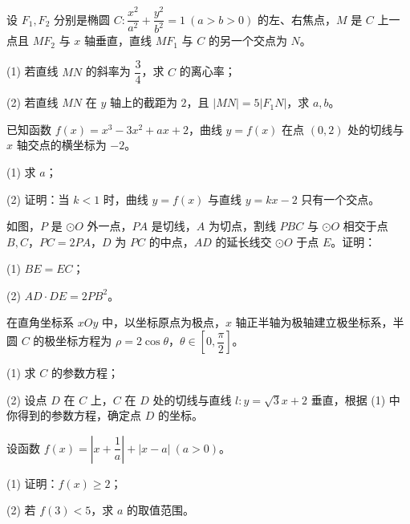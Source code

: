 \begin{question}
设 $F_1,F_2$ 分别是椭圆 $C:\dfrac{x^2}{a^2}+\dfrac{y^2}{b^2}=1\ (a>b>0)$ 的左、右焦点，$M$ 是 $C$ 上一点且 $MF_2$ 与 $x$ 轴垂直，直线 $MF_1$ 与 $C$ 的另一个交点为 $N$。

(1) 若直线 $MN$ 的斜率为 $\dfrac34$，求 $C$ 的离心率；

(2) 若直线 $MN$ 在 $y$ 轴上的截距为 $2$，且 $|MN|=5|F_1N|$，求 $a,b$。

\end{question}
\begin{question}
已知函数 $f(x)=x^3-3x^2+ax+2$，曲线 $y=f(x)$ 在点 $(0,2)$ 处的切线与 $x$ 轴交点的横坐标为 $-2$。

(1) 求 $a$；

(2) 证明：当 $k<1$ 时，曲线 $y=f(x)$ 与直线 $y=kx-2$ 只有一个交点。

\Needspace{0.4\textheight}
\end{question}
\begin{question}
如图，$P$ 是 $\odot O$ 外一点，$PA$ 是切线，$A$ 为切点，割线 $PBC$ 与 $\odot O$ 相交于点 $B,C$，$PC=2PA$，$D$ 为 $PC$ 的中点，$AD$ 的延长线交 $\odot O$ 于点 $E$。证明：
\nopagebreak[4]
\begin{center}\end{center}
\nopagebreak[4]
(1) $BE=EC$；

(2) $AD\cdot DE=2PB^2$。

\end{question}
\begin{question}
在直角坐标系 $xOy$ 中，以坐标原点为极点，$x$ 轴正半轴为极轴建立极坐标系，半圆 $C$ 的极坐标方程为 $\rho=2\cos\theta$，$\theta\in\left[0,\dfrac\pi2\right]$。

(1) 求 $C$ 的参数方程；

(2) 设点 $D$ 在 $C$ 上，$C$ 在 $D$ 处的切线与直线 $l:y=\sqrt3x+2$ 垂直，根据 (1) 中你得到的参数方程，确定点 $D$ 的坐标。

\end{question}
\begin{question}
设函数 $f(x)=\left|x+\dfrac1a\right|+|x-a|\ (a>0)$。

(1) 证明：$f(x)\geqslant2$；

(2) 若 $f(3)<5$，求 $a$ 的取值范围。

\end{question}